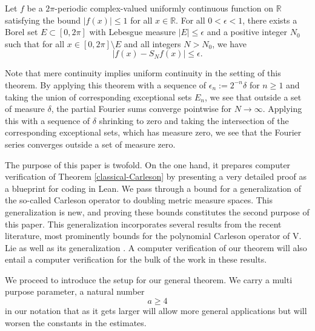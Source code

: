\begin{theorem}
\label{classical-Carleson}
Let $f$ be a $2\pi$-periodic complex-valued uniformly continuous function on $\mathbb{R}$ satisfying the bound $|f(x)|\le 1$ for all $x\in \mathbb{R}$. For all $0<\epsilon<1$, there exists a Borel set $E\subset [0,2\pi]$ with Lebesgue measure $|E|\le \epsilon$ and a positive integer $N_0$ such that for all $x\in [0,2\pi]\setminus E$ and all integers $N>N_0$, we have
\begin{equation}\label{aeconv}
|f(x)-S_N f(x)|\le \epsilon.
\end{equation}
\end{theorem}

Note that mere continuity implies uniform continuity in the setting of this theorem. By applying this theorem with a sequence of $\epsilon_n:= 2^{-n}\delta$ for $n\ge 1$ and taking the union of corresponding exceptional sets $E_n$, we see that outside a set of measure $\delta$, the partial Fourier sums converge pointwise for $N\to \infty$. Applying this with a sequence of $\delta$ shrinking to zero and taking the intersection of the corresponding exceptional sets, which has measure zero, we see that the Fourier series converges outside a set of measure zero.

The purpose of this paper is twofold. On the one hand, it prepares computer verification of Theorem \ref{classical-Carleson} by presenting a very detailed proof as a blueprint for coding in Lean. We pass through a bound for a generalization of the so-called Carleson operator to doubling metric measure spaces. This generalization is new, and proving these bounds constitutes the second purpose of this paper. This generalization incorporates several results from the recent literature, most prominently bounds for the polynomial Carleson operator of V. Lie \cite{lie-polynomial} as well as its generalization \cite{zk-polynomial}. A computer verification of our theorem will also entail a computer verification for the bulk of the work in these results.


We proceed to introduce the setup for our general theorem.
We carry a multi purpose parameter, a natural number
\begin{equation}
    a\ge 4
\end{equation} in our notation that as it gets larger will allow more general applications but will worsen the constants in the estimates.



